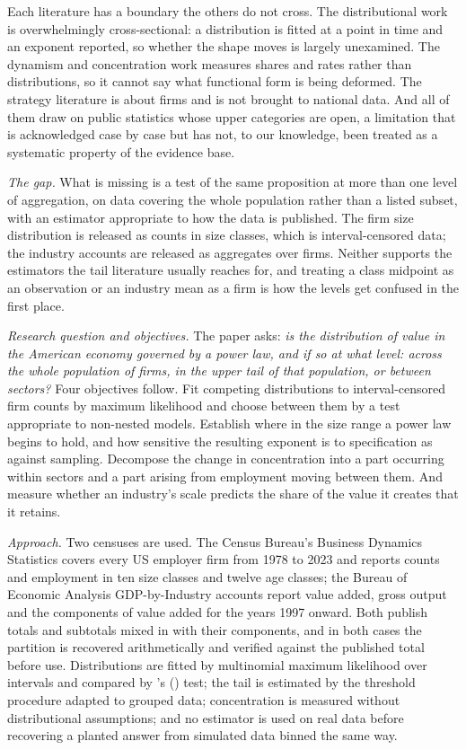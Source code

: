 \documentclass[jrfm,article,submit,pdftex,moreauthors]{Definitions/mdpi}
\begin{document}
Each literature has a boundary the others do not cross. The distributional work is
overwhelmingly cross-sectional: a distribution is fitted at a point in time and an exponent
reported, so whether the shape moves is largely unexamined. The dynamism and concentration
work measures shares and rates rather than distributions, so it cannot say what functional
form is being deformed. The strategy literature is about firms and is not brought to
national data. And all of them draw on public statistics whose upper categories are open,
a limitation that is acknowledged case by case but has not, to our knowledge, been treated
as a systematic property of the evidence base.

\emph{The gap.} What is missing is a test of the same proposition at more than one level of
aggregation, on data covering the whole population rather than a listed subset, with an estimator
appropriate to how the data is published. The firm size distribution is
released as counts in size classes, which is interval-censored data; the industry accounts
are released as aggregates over firms. Neither supports the estimators the tail literature
usually reaches for, and treating a class midpoint as an observation or an industry mean as
a firm is how the levels get confused in the first place.

\emph{Research question and objectives.} The paper asks: \emph{is the distribution of value in the American economy governed by a power law, and
if so at what level: across the whole population of firms, in the upper tail of that
population, or between sectors?} Four
objectives follow. Fit competing distributions to interval-censored firm counts by maximum
likelihood and choose between them by a test appropriate to non-nested models. Establish
where in the size range a power law begins to hold, and how sensitive the resulting exponent
is to specification as against sampling. Decompose the change in concentration into a part
occurring within sectors and a part arising from employment moving between them. And measure
whether an industry's scale predicts the share of the value it creates that it retains.

\emph{Approach.} Two censuses are used. The Census Bureau's Business Dynamics Statistics
covers every US employer firm from 1978 to 2023 and reports counts and employment in ten
size classes and twelve age classes; the Bureau of Economic Analysis GDP-by-Industry
accounts report value added, gross output and the components of value added for the years
1997 onward. Both publish totals and subtotals mixed in with their components, and in both
cases the partition is recovered arithmetically and verified against the published total
before use. Distributions are fitted by multinomial maximum likelihood over intervals and
compared by \citeauthor{Vuong1989}'s (\citeyear{Vuong1989}) test; the tail is estimated by
the \citet{ClausetShaliziNewman2009} threshold procedure adapted to grouped data;
concentration is measured without distributional assumptions; and no estimator is used on
real data before recovering a planted answer from simulated data binned the same way.
\end{document}
